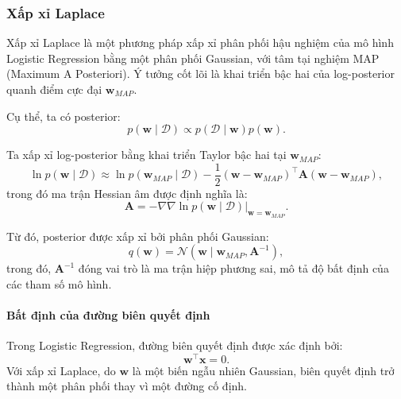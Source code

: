 \subsubsection{Xấp xỉ Laplace}

Xấp xỉ Laplace là một phương pháp xấp xỉ phân phối hậu nghiệm của mô hình
Logistic Regression bằng một phân phối Gaussian, với tâm tại nghiệm MAP
(Maximum A Posteriori). Ý tưởng cốt lõi là khai triển bậc hai của log-posterior
quanh điểm cực đại $\boldsymbol{w}_{MAP}$.

Cụ thể, ta có posterior: \begin{equation}
  p(\boldsymbol{w} \mid \mathcal{D}) \propto p(\mathcal{D} \mid \boldsymbol{w})
  p(\boldsymbol{w}).
\end{equation}

Ta xấp xỉ log-posterior bằng khai triển Taylor bậc hai tại
$\boldsymbol{w}_{MAP}$: \begin{equation}
  \ln p(\boldsymbol{w} \mid \mathcal{D}) \approx \ln p(\boldsymbol{w}_{MAP}
  \mid \mathcal{D}) - \frac{1}{2} (\boldsymbol{w} -
  \boldsymbol{w}_{MAP})^\intercal \boldsymbol{A} (\boldsymbol{w} -
  \boldsymbol{w}_{MAP}),
\end{equation} trong đó ma trận Hessian âm được định nghĩa là: \begin{equation}
  \boldsymbol{A} = - \nabla \nabla \ln p(\boldsymbol{w} \mid \mathcal{D})
  \Big|_{\boldsymbol{w} = \boldsymbol{w}_{MAP}}.
\end{equation}

Từ đó, posterior được xấp xỉ bởi phân phối Gaussian: \begin{equation}
  q(\boldsymbol{w}) = \mathcal{N}(\boldsymbol{w} \mid \boldsymbol{w}_{MAP},
  \boldsymbol{A}^{-1}),
\end{equation} trong đó, $\boldsymbol{A}^{-1}$ đóng vai trò là ma trận hiệp
phương sai, mô tả độ bất định của các tham số mô hình.

\paragraph{Bất định của đường biên quyết định}

Trong Logistic Regression, đường biên quyết định được xác định bởi:
\begin{equation}
  \boldsymbol{w}^\intercal \boldsymbol{x} = 0.
\end{equation} Với xấp xỉ Laplace, do $\boldsymbol{w}$ là một biến ngẫu nhiên
Gaussian, biên quyết định trở thành một phân phối thay vì một đường cố định.

